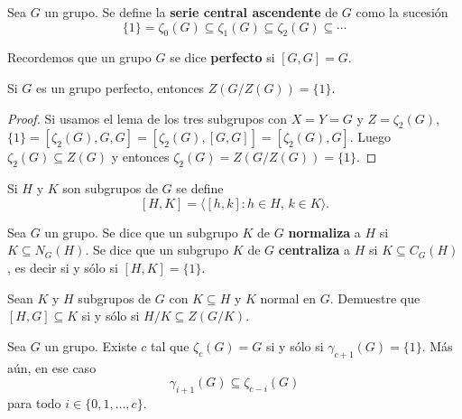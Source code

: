 \begin{definition}
	Sea $G$ un grupo. Se define la \textbf{serie central ascendente} de $G$
	como la sucesión
	\[
		\{1\}=\zeta_0(G)\subseteq\zeta_1(G)\subseteq\zeta_2(G)\subseteq\cdots
	\]
\end{definition}


Recordemos que un grupo $G$ se dice \textbf{perfecto} si $[G,G]=G$.

\begin{theorem}[Gr\"un]
	\label{theorem:Grun}
	Si $G$ es un grupo perfecto, entonces $Z(G/Z(G))=\{1\}$. 
\end{theorem}

\begin{proof}
	Si usamos el lema de los tres subgrupos con $X=Y=G$ y $Z=\zeta_2(G)$, 
	$\{1\}=[\zeta_2(G),G,G]=[\zeta_2(G),[G,G]]=[\zeta_2(G),G]$. Luego 	
	$\zeta_2(G)\subseteq Z(G)$ y
	entonces $\zeta_2(G)=Z(G/Z(G))=\{1\}$. 
\end{proof}




Si $H$ y $K$ son subgrupos de $G$ se define
\[
	[H,K]=\langle [h,k]:h\in H,\,k\in K\rangle.
\]

    Sea $G$ un grupo. Se dice que un subgrupo $K$ de $G$ \textbf{normaliza} a
	$H$ si $K\subseteq N_G(H)$.
	Se dice que un subgrupo $K$ de $G$ \textbf{centraliza} a
	$H$ si $K\subseteq C_G(H)$, es decir si y sólo si $[H,K]=\{1\}$.

\begin{exercise}
	Sean $K$ y $H$ subgrupos de $G$ con $K\subseteq H$ y $K$ normal en $G$.
	Demuestre que $[H,G]\subseteq K$ si y sólo si $H/K\subseteq Z(G/K)$. 
\end{exercise}
\begin{lemma}
	\label{lemma:gamma_zeta}
	Sea $G$ un grupo. Existe $c$ tal que $\zeta_c(G)=G$ si y sólo si 
	$\gamma_{c+1}(G)=\{1\}$. Más aún, en ese caso 
	\[
	\gamma_{i+1}(G)\subseteq\zeta_{c-i}(G)
	\]
	para todo $i\in\{0,1,\dots,c\}$. 
\end{lemma}

